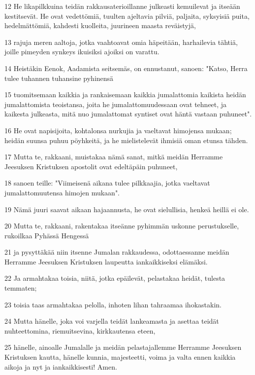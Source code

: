 \par 12 He likapilkkuina teidän rakkausaterioillanne julkeasti kemuilevat ja itseään kestitsevät. He ovat vedettömiä, tuulten ajeltavia pilviä, paljaita, syksyisiä puita, hedelmättömiä, kahdesti kuolleita, juurineen maasta reväistyjä,
\par 13 rajuja meren aaltoja, jotka vaahtoavat omia häpeitään, harhailevia tähtiä, joille pimeyden synkeys ikuisiksi ajoiksi on varattu.
\par 14 Heistäkin Eenok, Aadamista seitsemäs, on ennustanut, sanoen: "Katso, Herra tulee tuhannen tuhansine pyhinensä
\par 15 tuomitsemaan kaikkia ja rankaisemaan kaikkia jumalattomia kaikista heidän jumalattomista teoistansa, joita he jumalattomuudessaan ovat tehneet, ja kaikesta julkeasta, mitä nuo jumalattomat syntiset ovat häntä vastaan puhuneet".
\par 16 He ovat napisijoita, kohtalonsa nurkujia ja vaeltavat himojensa mukaan; heidän suunsa puhuu pöyhkeitä, ja he mielistelevät ihmisiä oman etunsa tähden.
\par 17 Mutta te, rakkaani, muistakaa nämä sanat, mitkä meidän Herramme Jeesuksen Kristuksen apostolit ovat edeltäpäin puhuneet,
\par 18 sanoen teille: "Viimeisenä aikana tulee pilkkaajia, jotka vaeltavat jumalattomuutensa himojen mukaan".
\par 19 Nämä juuri saavat aikaan hajaannusta, he ovat sielullisia, henkeä heillä ei ole.
\par 20 Mutta te, rakkaani, rakentakaa itseänne pyhimmän uskonne perustukselle, rukoilkaa Pyhässä Hengessä
\par 21 ja pysyttäkää niin itsenne Jumalan rakkaudessa, odottaessanne meidän Herramme Jeesuksen Kristuksen laupeutta iankaikkiseksi elämäksi.
\par 22 Ja armahtakaa toisia, niitä, jotka epäilevät, pelastakaa heidät, tulesta temmaten;
\par 23 toisia taas armahtakaa pelolla, inhoten lihan tahraamaa ihokastakin.
\par 24 Mutta hänelle, joka voi varjella teidät lankeamasta ja asettaa teidät nuhteettomina, riemuitsevina, kirkkautensa eteen,
\par 25 hänelle, ainoalle Jumalalle ja meidän pelastajallemme Herramme Jeesuksen Kristuksen kautta, hänelle kunnia, majesteetti, voima ja valta ennen kaikkia aikoja ja nyt ja iankaikkisesti! Amen.


